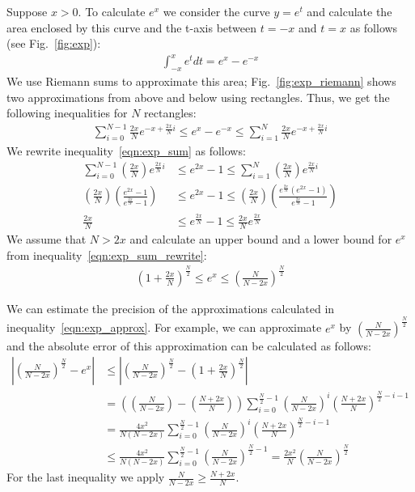 \documentclass{article}
\numberwithin{mytheorem}{section}
\begin{document}
Suppose $x>0$. To calculate $e^x$ we consider the curve $y=e^t$ and calculate the area enclosed by this curve and the t-axis between $t=-x$ and $t=x$ as follows (see Fig.~\ref{fig:exp}):
\begin{align*}
\int_{-x}^{x} e^t dt=e^x-e^{-x}
\end{align*}
We use Riemann sums to approximate this area; Fig.~\ref{fig:exp_riemann} shows two approximations from above and below using rectangles. Thus, we get the following inequalities for $N$ rectangles:
\begin{align}
\sum_{i=0}^{N-1}\frac{2x}{N}e^{-x+\frac{2x}{N}i}\leq e^x-e^{-x}\leq \sum_{i=1}^{N}\frac{2x}{N}e^{-x+\frac{2x}{N}i}\label{eqn:exp_sum}
\end{align}
We rewrite inequality~\eqref{eqn:exp_sum} as follows:
\begin{align}
\sum_{i=0}^{N-1}(\frac{2x}{N})e^{\frac{2x}{N}i}&\leq e^{2x}-1\leq \sum_{i=1}^{N}(\frac{2x}{N})e^{\frac{2x}{N}i}\nonumber\\
(\frac{2x}{N})(\frac{e^{2x}-1}{e^{\frac{2x}{N}}-1})&\leq e^{2x}-1\leq (\frac{2x}{N})(\frac{e^{\frac{2x}{N}}(e^{2x}-1)}{e^{\frac{2x}{N}}-1})\nonumber\\
\frac{2x}{N}&\leq e^{\frac{2x}{N}}-1 \leq \frac{2x}{N}e^{\frac{2x}{N}}\label{eqn:exp_sum_rewrite}
\end{align}
We assume that $N>2x$ and calculate an upper bound and a lower bound for $e^x$ from inequality~\eqref{eqn:exp_sum_rewrite}:
\begin{align}
(1+\frac{2x}{N})^{\frac{N}{2}} \leq e^x\leq (\frac{N}{N-2x})^{\frac{N}{2}}\label{eqn:exp_approx}
\end{align}

We can estimate the precision of the approximations calculated in inequality~\eqref{eqn:exp_approx}. For example, we can approximate $e^x$ by $(\frac{N}{N-2x})^{\frac{N}{2}}$ and the absolute error of this approximation can be calculated as follows:
\begin{align}
|(\frac{N}{N-2x})^{\frac{N}{2}}-e^x|&\leq |(\frac{N}{N-2x})^{\frac{N}{2}}-(1+\frac{2x}{N})^{\frac{N}{2}}|\nonumber\\
&=((\frac{N}{N-2x})-(\frac{N+2x}{N}))\sum_{i=0}^{\frac{N}{2}-1}(\frac{N}{N-2x})^i(\frac{N+2x}{N})^{\frac{N}{2}-i-1}\nonumber\\
&=\frac{4x^2}{N(N-2x)}\sum_{i=0}^{\frac{N}{2}-1}(\frac{N}{N-2x})^i(\frac{N+2x}{N})^{\frac{N}{2}-i-1}\nonumber\\
&\leq \frac{4x^2}{N(N-2x)}\sum_{i=0}^{\frac{N}{2}-1}(\frac{N}{N-2x})^{\frac{N}{2}-1}=\frac{2x^2}{N}(\frac{N}{N-2x})^{\frac{N}{2}}\label{eqn:exp_riemann_prec}
\end{align}
For the last inequality we apply $\frac{N}{N-2x} \geq \frac{N+2x}{N}$.
\end{document}
